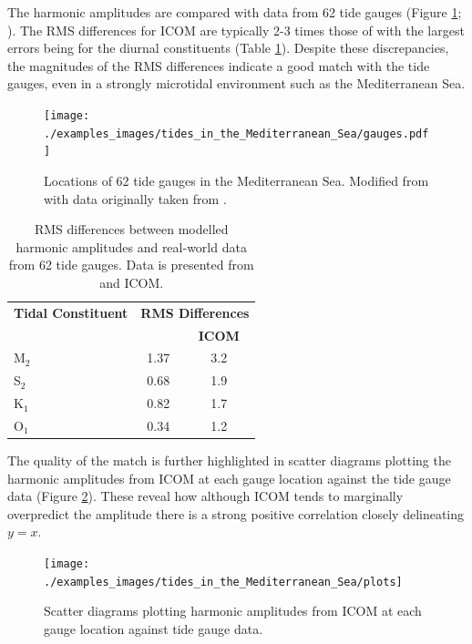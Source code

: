 The harmonic amplitudes are compared with data from 62 tide gauges (Figure \ref{gauge}; \citealp{Tsimplis1995,Wells2008}).
The RMS differences for ICOM are typically 2-3 times those of \citet{Tsimplis1995}    
with the largest errors being for the diurnal constituents (Table \ref{rms}). Despite these discrepancies, the
magnitudes of the RMS differences indicate a good match with the tide gauges, even in a strongly microtidal environment 
such as the Mediterranean Sea. 

\begin{figure}[htbp]
\centering
\texttt{[image: ./examples\_images/tides\_in\_the\_Mediterranean\_Sea/gauges.pdf]}
\caption{Locations of 62 tide gauges in the Mediterranean Sea. Modified from \citet{Wells2008} with data originally taken from 
\citet{Tsimplis1995}. }
\label{gauge}
\end{figure}

\begin{table}[htbp]
\centering
\begin{tabular}{l c c}
\hline
\bf{Tidal Constituent} & \multicolumn{2}{c}{\bf{RMS Differences}} \\
\cline{2-3}
& \bf{\citet{Tsimplis1995}} & \bf{ICOM} \\
\hline
M$_{\text{2}}$ &1.37 & 3.2\\
S$_{\text{2}}$ &0.68 & 1.9\\
K$_{\text{1}}$ &0.82 & 1.7\\
O$_{\text{1}}$ &0.34 & 1.2\\
\hline
\end{tabular}
\caption{RMS differences between modelled harmonic amplitudes and real-world data from 62 tide gauges.
Data is presented from \citet{Tsimplis1995} and ICOM. }
\label{rms}
\end{table}

The quality of the match is further highlighted in scatter diagrams plotting 
the harmonic amplitudes from ICOM at each gauge location against the tide gauge data (Figure \ref{plots}).
These reveal how although ICOM tends to marginally overpredict the amplitude there is a strong
positive correlation closely delineating $y=x$. 

\begin{figure}[t]
\centering
\texttt{[image: ./examples\_images/tides\_in\_the\_Mediterranean\_Sea/plots]}
\caption{Scatter diagrams plotting harmonic amplitudes from ICOM at each gauge location against tide gauge data.} 
\label{plots}
\end{figure}


